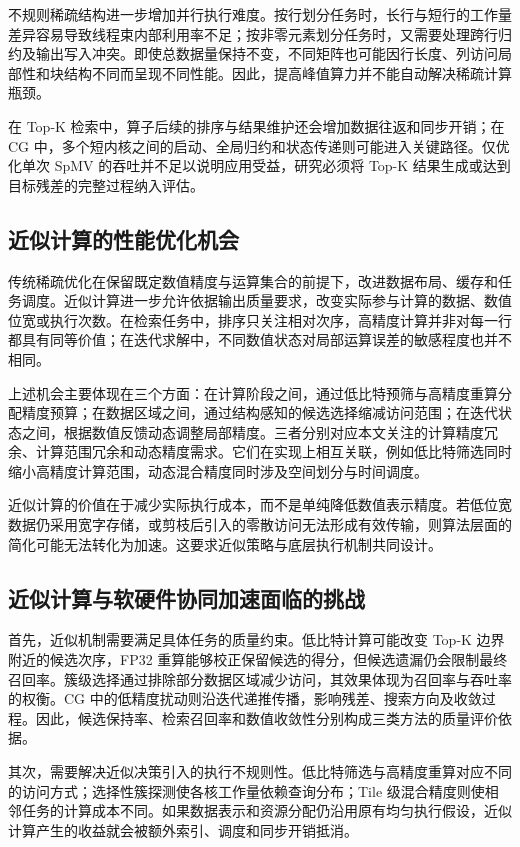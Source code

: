 不规则稀疏结构进一步增加并行执行难度。按行划分任务时，长行与短行的工作量差异容易导致线程束内部利用率不足；按非零元素划分任务时，又需要处理跨行归约及输出写入冲突。即使总数据量保持不变，不同矩阵也可能因行长度、列访问局部性和块结构不同而呈现不同性能\cite{li2014performance,xia2022comprehensive}。因此，提高峰值算力并不能自动解决稀疏计算瓶颈。

在 Top-K 检索中，算子后续的排序与结果维护还会增加数据往返和同步开销；在 CG 中，多个短内核之间的启动、全局归约和状态传递则可能进入关键路径。仅优化单次 SpMV 的吞吐并不足以说明应用受益，研究必须将 Top-K 结果生成或达到目标残差的完整过程纳入评估。

\subsection{近似计算的性能优化机会}
传统稀疏优化在保留既定数值精度与运算集合的前提下，改进数据布局、缓存和任务调度。近似计算进一步允许依据输出质量要求，改变实际参与计算的数据、数值位宽或执行次数。在检索任务中，排序只关注相对次序，高精度计算并非对每一行都具有同等价值；在迭代求解中，不同数值状态对局部运算误差的敏感程度也并不相同。

上述机会主要体现在三个方面：在计算阶段之间，通过低比特预筛与高精度重算分配精度预算；在数据区域之间，通过结构感知的候选选择缩减访问范围；在迭代状态之间，根据数值反馈动态调整局部精度。三者分别对应本文关注的计算精度冗余、计算范围冗余和动态精度需求。它们在实现上相互关联，例如低比特筛选同时缩小高精度计算范围，动态混合精度同时涉及空间划分与时间调度。

近似计算的价值在于减少实际执行成本，而不是单纯降低数值表示精度。若低位宽数据仍采用宽字存储，或剪枝后引入的零散访问无法形成有效传输，则算法层面的简化可能无法转化为加速。这要求近似策略与底层执行机制共同设计。

\subsection{近似计算与软硬件协同加速面临的挑战}
首先，近似机制需要满足具体任务的质量约束。低比特计算可能改变 Top-K 边界附近的候选次序，FP32 重算能够校正保留候选的得分，但候选遗漏仍会限制最终召回率。簇级选择通过排除部分数据区域减少访问，其效果体现为召回率与吞吐率的权衡。CG 中的低精度扰动则沿迭代递推传播，影响残差、搜索方向及收敛过程。因此，候选保持率、检索召回率和数值收敛性分别构成三类方法的质量评价依据。

其次，需要解决近似决策引入的执行不规则性。低比特筛选与高精度重算对应不同的访问方式；选择性簇探测使各核工作量依赖查询分布；Tile 级混合精度则使相邻任务的计算成本不同。如果数据表示和资源分配仍沿用原有均匀执行假设，近似计算产生的收益就会被额外索引、调度和同步开销抵消。

